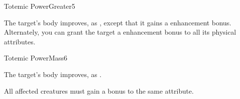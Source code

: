 \begin{spellsection}{Totemic Power}{Greater}{5}
\begin{spellheader}
    \begin{spelltargetinginfo}
    \end{spelltargetinginfo}
\end{spellheader}
\begin{spellcontent}
    \begin{spelleffects}
        \spelleffect The target's body improves, as , except that it gains a  enhancement bonus. Alternately, you can grant the target a  enhancement bonus to all its physical attributes.
        \spelldur \durshort
    \end{spelleffects}
\end{spellcontent}
\begin{spellfooter}
\end{spellfooter}
\end{spellsection}

\begin{spellsection}{Totemic Power}{Mass}{6}
\begin{spellheader}
    \begin{spelltargetinginfo}
    \end{spelltargetinginfo}
\end{spellheader}
\begin{spellcontent}
    \begin{spelleffects}
        \spelleffect The target's body improves, as . 
    \end{spelleffects}
\end{spellcontent}
\begin{spellfooter}
    \spellnotes All affected creatures must gain a bonus to the same attribute.
\end{spellfooter}
\end{spellsection}

